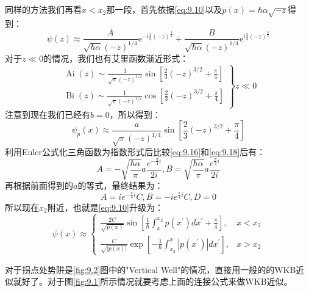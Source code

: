 \documentclass[a4paper,zihao=-4,linespread=1]{ctexrep}
\begin{document}
    同样的方法我们再看$x<x_2$那一段，首先依据\ref{eq:9.10}以及$p(x)=\hbar\alpha\sqrt{-z}$得到：
    \begin{equation}
        \label{eq:9.16}
        \psi(z)\approx\frac{A}{\sqrt{\hbar\alpha}(-z)^{1/4}}\mathrm{e}^{-i\frac{2}{3}(-z)^\frac{3}{2}}+\frac{B}{\sqrt{\hbar\alpha}(-z)^{1/4}}\mathrm{e}^{i\frac{2}{3}(-z)^\frac{3}{2}}
    \end{equation}
    对于$z\ll 0$的情况，我们也有艾里函数渐近形式：
    \begin{equation}
        \left.\begin{array}{l}
            \operatorname{Ai}(z) \sim \frac{1}{\sqrt{\pi}(-z)^{1 / 4}} \sin \left[\frac{2}{3}(-z)^{3 / 2}+\frac{\pi}{4}\right] \\
            \operatorname{Bi}(z) \sim \frac{1}{\sqrt{\pi}(-z)^{1 / 4}} \cos \left[\frac{2}{3}(-z)^{3 / 2}+\frac{\pi}{4}\right]
            \end{array}\right\} z \ll 0
    \end{equation}
    注意到现在我们已经有$b=0$，所以得到：
    \begin{equation}
        \label{eq:9.18}
        \psi_{p}(x) \approx \frac{a}{\sqrt{\pi}(-z)^{1 / 4}} \sin \left[\frac{2}{3}(-z)^{3 / 2}+\frac{\pi}{4}\right]
    \end{equation}
    利用Euler公式化三角函数为指数形式后比较\ref{eq:9.16}和\ref{eq:9.18}后有：
    \[A=-\sqrt{\frac{\hbar\alpha}{\pi}}a\frac{e^{-\frac{\pi}{4}i}}{2i},B=\sqrt{\frac{\hbar\alpha}{\pi}}a\frac{e^{\frac{\pi}{4}i}}{2i}\]
    再根据前面得到的$a$的等式，最终结果为：
    \begin{equation}
        A=ie^{-\frac{\pi}{4}i}C,B=-ie^{\frac{\pi}{4}i}C,D=0
    \end{equation}
    所以现在$x_2$附近，也就是\ref{eq:9.10}升级为：
    \begin{equation}
        \label{eq:9.20}
        \psi(x) \approx\left\{\begin{array}{ll}
            \frac{2 C}{\sqrt{p(x)}} \sin \left[\frac{1}{\hbar} \int_{x}^{x_{2}} p\left(x^{\prime}\right) d x^{\prime}+\frac{\pi}{4}\right], & x<x_{2} \\
            \frac{C}{\sqrt{|p(x)|}} \exp \left[-\frac{1}{\hbar} \int_{x_{2}}^{x}\left|p\left(x^{\prime}\right)\right| d x^{\prime}\right], & x>x_{2}
            \end{array}\right.
    \end{equation}
    
    对于拐点处势阱是\ref{fig:9.2}图中的"Vertical Well"的情况，直接用一般的的WKB近似就好了。对于图\ref{fig:9.1}所示情况就要考虑上面的连接公式来做WKB近似。
    
\end{document}

